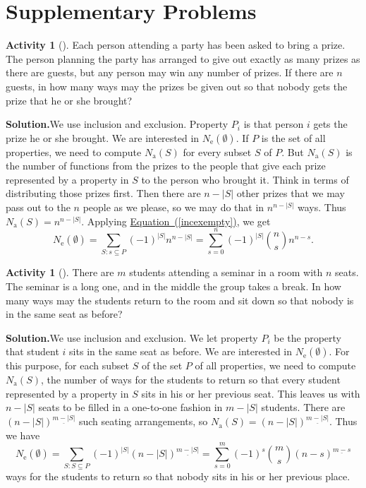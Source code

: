 \documentclass[10pt,]{book}
\theoremstyle{plain}
\theoremstyle{definition}
\newtheorem{activity}[project]{Activity}
\numberwithin{equation}{chapter}
\begin{document}
\section[{Supplementary Problems}]{Supplementary Problems}\label{sec_inclexcl-suppprobs}
\begin{activity}[]\label{activity-226}
Each person attending a party has been asked to bring a prize. The person planning the party has arranged to give out exactly as many prizes as there are guests, but any person may win any number of prizes. If there are \(n\) guests, in how many ways may the prizes be given out so that nobody gets the prize that he or she brought?%
\par\medskip\noindent%
\textbf{Solution.}\quad We use inclusion and exclusion. Property \(P_i\) is that person \(i\) gets the prize he or she brought. We are interested in \(N_{\mbox{e} }(\emptyset)\). If \(P\) is the set of all properties, we need to compute \(N_{\mbox{a} }(S)\) for every subset \(S\) of \(P\). But \(N_{\mbox{a} }(S)\) is the number of functions from the prizes to the people that give each prize represented by a property in \(S\) to the person who brought it. Think in terms of distributing those prizes first. Then there are \(n-|S|\) other prizes that we may pass out to the \(n\) people as we please, so we may do that in \(n^{n-|S|}\) ways. Thus \(N_{\mbox{a} }(S)=n^{n-|S|}\). Applying \hyperref[incexempty]{Equation~(\ref{incexempty})}, we get%
\begin{equation*}
N_{\mbox{e} }(\emptyset)=\sum_{S:s\subseteq P}(-1)^{|S|} n^{n-|S|} =
\sum_{s=0}^n (-1)^{|S|}\binom{n}{s}n^{n-s}.
\end{equation*}
%
\end{activity}
\begin{activity}[]\label{activity-227}
There are \(m\) students attending a seminar in a room with \(n\) seats. The seminar is a long one, and in the middle the group takes a break. In how many ways may the students return to the room and sit down so that nobody is in the same seat as before?%
\par\medskip\noindent%
\textbf{Solution.}\quad We use inclusion and exclusion. We let property \(P_i\) be the property that student \(i\) sits in the same seat as before. We are interested in \(N_{\mbox{e} }(\emptyset)\). For this purpose, for each subset \(S\) of the set \(P\) of all properties, we need to compute \(N_{\mbox{a} }(S)\), the number of ways for the students to return so that every student represented by a property in \(S\) sits in his or her previous seat. This leaves us with \(n-|S|\) seats to be filled in a one-to-one fashion in \(m-|S|\) students. There are \((n-|S|)^{\underline{m-|S|}}\) such seating arrangements, so \(N_{\mbox{a} }(S)= (n-|S|)^{\underline{m-|S|}}\). Thus we have%
\begin{equation*}
N_{\mbox{e} }(\emptyset)=\sum_{S:S\subseteq P}
(-1)^{|S|}(n-|S|)^{\underline{m-|S|}} = \sum_{s=0}^m (-1)^s\binom{m}{s}(n-s)^{\underline{m-s}}
\end{equation*}
ways for the students to return so that nobody sits in his or her previous place.%
\end{activity}
\end{document}
